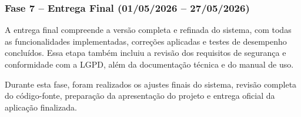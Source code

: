 \subsubsection{Fase 7 – Entrega Final (01/05/2026 – 27/05/2026)}

A entrega final compreende a versão completa e refinada do sistema, com todas as funcionalidades implementadas, correções aplicadas e testes de desempenho concluídos. Essa etapa também incluiu a revisão dos requisitos de segurança e conformidade com a LGPD, além da documentação técnica e do manual de uso.  

Durante esta fase, foram realizados os ajustes finais do sistema, revisão completa do código-fonte, preparação da apresentação do projeto e entrega oficial da aplicação finalizada.